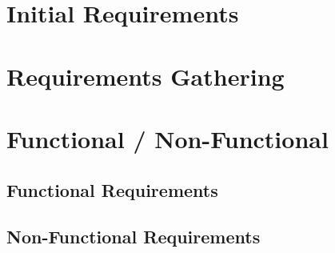 \section{Initial Requirements}
\section{Requirements Gathering}
\section{Functional / Non-Functional}
\subsection{Functional Requirements}
\subsection{Non-Functional Requirements}